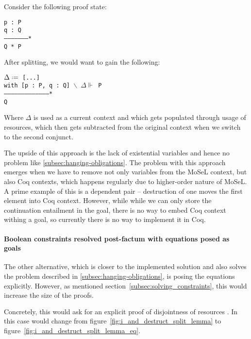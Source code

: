 Consider the following proof state:

\begin{minipage}{\linewidth}
\texttt{p : P\\
q : Q\\
--------------------*\\
Q * P
}
\end{minipage}

After splitting, we would want to gain the following:

\begin{minipage}{\linewidth}
\texttt{$\Delta \defeq$ [...]\\
with [p : P, q : Q] $\backslash \,\,\, \Delta \Vdash$ P\\
---------------------------------------*\\
Q
}
\end{minipage}

Where \(\Delta\) is used as a current context and which gets populated through usage of resources, which then gets subtracted from the original context when we switch to the second conjunct.

The upside of this approach is the lack of existential variables and hence no problem like \ref{subsec:hanging-obligations}.
The problem with this approach emerges when we have to remove not only variables from the MoSeL context, but also Coq contexts, which happens regularly due to higher-order nature of MoSeL.
A prime example of this is a dependent pair -- destruction of one moves the first element into Coq context.
However, while while we can only store the continuation entailment in the goal, there is no way to embed Coq context withing a goal, so currently there is no way to implement it in Coq.

\paragraph{Boolean constraints resolved post-factum with equations posed as goals}

The other alternative, which is closer to the implemented solution and also solves the problem described in \ref{subsec:hanging-obligations}, is posing the equations explicitly.
However, as mentioned section~\ref{subsec:solving_constraints}, this would increase the size of the proofs.

Concretely, this would ask for an explicit proof of disjointness of resources .
In this case  would change from figure~\ref{fig:i_and_destruct_split_lemma} to figure~\ref{fig:i_and_destruct_split_lemma_eq}.


